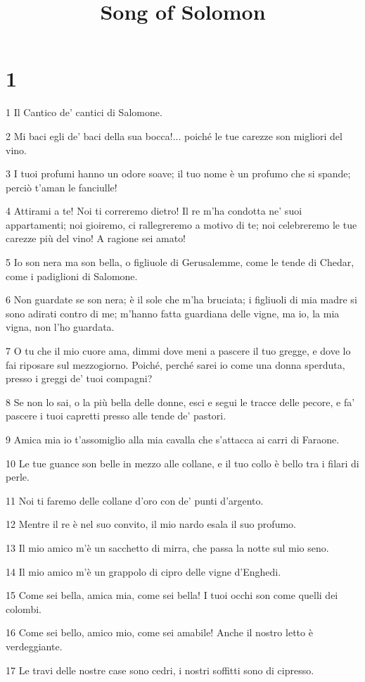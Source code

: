 

\title{Song of Solomon}


\chapter{1}

\par 1 Il Cantico de' cantici di Salomone.
\par 2 Mi baci egli de' baci della sua bocca!... poiché le tue carezze son migliori del vino.
\par 3 I tuoi profumi hanno un odore soave; il tuo nome è un profumo che si spande; perciò t'aman le fanciulle!
\par 4 Attirami a te! Noi ti correremo dietro! Il re m'ha condotta ne' suoi appartamenti; noi gioiremo, ci rallegreremo a motivo di te; noi celebreremo le tue carezze più del vino! A ragione sei amato!
\par 5 Io son nera ma son bella, o figliuole di Gerusalemme, come le tende di Chedar, come i padiglioni di Salomone.
\par 6 Non guardate se son nera; è il sole che m'ha bruciata; i figliuoli di mia madre si sono adirati contro di me; m'hanno fatta guardiana delle vigne, ma io, la mia vigna, non l'ho guardata.
\par 7 O tu che il mio cuore ama, dimmi dove meni a pascere il tuo gregge, e dove lo fai riposare sul mezzogiorno. Poiché, perché sarei io come una donna sperduta, presso i greggi de' tuoi compagni?
\par 8 Se non lo sai, o la più bella delle donne, esci e segui le tracce delle pecore, e fa' pascere i tuoi capretti presso alle tende de' pastori.
\par 9 Amica mia io t'assomiglio alla mia cavalla che s'attacca ai carri di Faraone.
\par 10 Le tue guance son belle in mezzo alle collane, e il tuo collo è bello tra i filari di perle.
\par 11 Noi ti faremo delle collane d'oro con de' punti d'argento.
\par 12 Mentre il re è nel suo convito, il mio nardo esala il suo profumo.
\par 13 Il mio amico m'è un sacchetto di mirra, che passa la notte sul mio seno.
\par 14 Il mio amico m'è un grappolo di cipro delle vigne d'Enghedi.
\par 15 Come sei bella, amica mia, come sei bella! I tuoi occhi son come quelli dei colombi.
\par 16 Come sei bello, amico mio, come sei amabile! Anche il nostro letto è verdeggiante.
\par 17 Le travi delle nostre case sono cedri, i nostri soffitti sono di cipresso.

